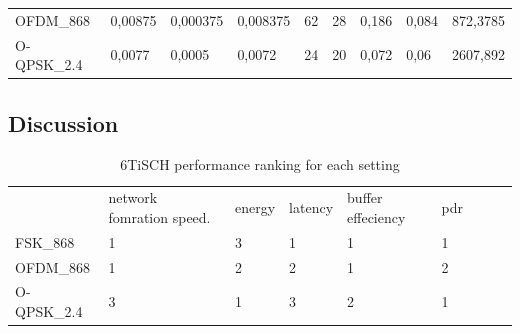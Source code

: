 \documentclass[journal]{IEEEtran}
\newcommand{\fsk}          {    FSK\_868}
\newcommand{\oqpsk}        {O-QPSK\_2.4}
\newcommand{\ofdm}         {OFDM\_868}
\begin{document}
\begin{table}[t]
\begin{center}
\begin{tabular}{lllllllll}
\ofdm  & 0,00875  & 0,000375         & 0,008375                                                    & 62                                                         & 28                                                         & 0,186                                                               & 0,084                                                                & 872,3785                                                           \\
\oqpsk & 0,0077   & 0,0005           & 0,0072                                                      & 24                                                         & 20                                                         & 0,072                                                               & 0,06                                                                 & 2607,892                                                          
\end{tabular}
\end{center}
\end{table}
\subsection{Discussion}
\label{sec:discussion}
\begin{table}[]
 \caption {6TiSCH performance ranking for each setting} \label{tab:summary}
\begin{tabular}{lllllllll}
      & network fomration speed. & energy & latency & buffer effeciency & pdr &  &  &  \\
\fsk   & 1                        & 3      & 1       & 1                 & 1   &  &  &  \\
\ofdm  & 1                        & 2      & 2       & 1                 & 2   &  &  &  \\
\oqpsk & 3                        & 1      & 3       & 2                 & 1   &  &  & 
\end{tabular}
\end{table}





\end{document}
